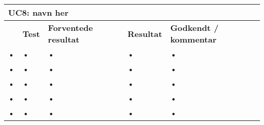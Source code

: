 
\begin{longtable}{|p{5mm}|p{40mm}|p{40mm}|p{20mm}|p{25mm}|}
\hline 
\multicolumn{5}{|l|}{\textbf{UC8: navn her}} \\ 
\hline 
& \textbf{Test}&\textbf{Forventede resultat}& \textbf{Resultat} & \textbf{Godkendt / kommentar} \\ 
\hline 
• & • & • & • & • \\ 
\hline 
• & • & • & • & • \\ 
\hline 
• & • & • & • & • \\ 
\hline 
• & • & • & • & • \\ 
\hline 
• & • & • & • & • \\ 
\hline 
\end{longtable} 